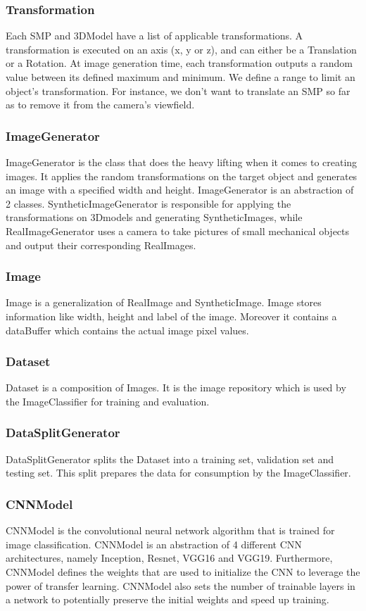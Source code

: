 \documentclass[a4paper,12pt,twoside]{report}
\begin{document}
\subsubsection{Transformation}
Each SMP and 3DModel have a list of applicable transformations. A transformation is executed on an axis (x, y or z), and can either be a Translation or a Rotation.
At image generation time, each transformation outputs a random value between its defined maximum and minimum. We define a range to limit an object's transformation. For instance, we don't want to translate an SMP so far as to remove it from the camera's viewfield.

\subsubsection{ImageGenerator}
ImageGenerator is the class that does the heavy lifting when it comes to creating images. It applies the random transformations on the target object and generates an image with a specified width and height.
ImageGenerator is an abstraction of 2 classes. SyntheticImageGenerator is responsible for applying the transformations on 3Dmodels and generating SyntheticImages, while RealImageGenerator uses a camera to take pictures of small mechanical objects and output their corresponding RealImages.

\subsubsection{Image}
Image is a generalization of RealImage and SyntheticImage. Image stores information like width, height and label of the image. Moreover it contains a dataBuffer which contains the actual image pixel values.

\subsubsection{Dataset}
Dataset is a composition of Images. It is the image repository which is used by the ImageClassifier for training and evaluation.

\subsubsection{DataSplitGenerator}
DataSplitGenerator splits the Dataset into a training set, validation set and testing set. This split prepares the data for consumption by the ImageClassifier.

\subsubsection{CNNModel}
CNNModel is the convolutional neural network algorithm that is trained for image classification. CNNModel is an abstraction of 4 different CNN architectures, namely Inception, Resnet, VGG16 and VGG19. Furthermore, CNNModel defines the weights that are used to initialize the CNN to leverage the power of transfer learning. CNNModel also sets the number of trainable layers in a network to potentially preserve the initial weights and speed up training.
\end{document}
